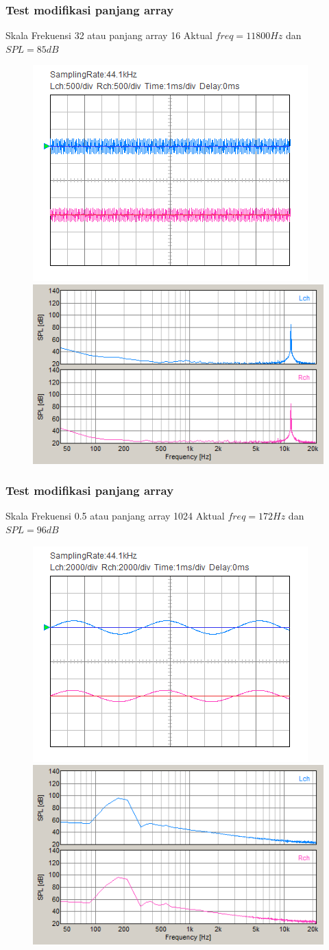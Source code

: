 \documentclass[table,dvipsnames,10pt]{beamer}
\begin{document}
	\begin{frame}[fragile]
	\frametitle{Test modifikasi panjang array}
	\begin{exampleblock}{Skala Frekuensi 32 atau panjang array 16}
		Aktual $freq = 11800 Hz$ dan $SPL = 85 dB$
		\begin{figure}[H]
			\centering
			\includegraphics[width=0.4\linewidth]{result/day_4/newsinehighest}
			\includegraphics[width=0.45\linewidth]{result/day_4/newsinehighestfft}
		\end{figure}
	\end{exampleblock}
	\end{frame}

	\begin{frame}[fragile]
	\frametitle{Test modifikasi panjang array}
	\begin{exampleblock}{Skala Frekuensi 0.5 atau panjang array 1024}
		Aktual $freq = 172 Hz$ dan $SPL = 96 dB$
		\begin{figure}[H]
			\centering
			\includegraphics[width=0.4\linewidth]{result/day_4/osi_sine0p5}
			\includegraphics[width=0.45\linewidth]{result/day_4/fft_sine0p5}
		\end{figure}
	\end{exampleblock}
	\end{frame}
\end{document}
